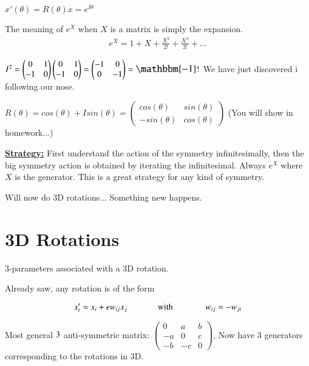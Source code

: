 {$x'(\theta) = R(\theta)x = e^{I\theta}$

The meaning of $e^X$ when $X$ is a matrix is simply the expansion.
\begin{eqnarray*}
e^X = 1 + X + \frac{X^2}{2!} + \frac{X^3}{3!} + \dots
\end{eqnarray*}


$I^2 =  \IMatrix\IMatrix = {\begin{pmatrix} -1 &  0  \\ 0  & -1 \end{pmatrix}} = \mathlarger{\mathlarger{\mathbbm{-1}}} ! $
We have just discovered i following our nose.

$R(\theta) = cos(\theta) + Isin(\theta) = {\begin{pmatrix} cos(\theta) &  sin(\theta)  \\ -sin(\theta)  & cos(\theta) \end{pmatrix}}$  (You will show in homework...)

\textbf{\underline{Strategy:}} First understand the action of the symmetry infinitesimally, then the big symmetry action is obtained by iterating the infinitesimal.
Always $e^X$ where $X$ is the generator. 
This is a great strategy for any kind of symmetry.

Will now do 3D rotations... Something new happens.

\section*{3D Rotations}

3-parameters associated with a 3D rotation.

Already saw, any rotation is of the form 

\begin{equation*}
x'_{i} = x_i + \epsilon w_{ij} x_j  \hspace{0.5in} \textrm{with } \hspace{0.5in} w_{ij} =- w_{ji}
\end{equation*}


Most general $3\time3$ anti-symmetric matrix: ${\begin{pmatrix} 0 & a & b  \\ -a & 0 & c \\ -b & -c & 0 \end{pmatrix}}$,  Now have 3 generators corresponding to the rotations in 3D.

}
